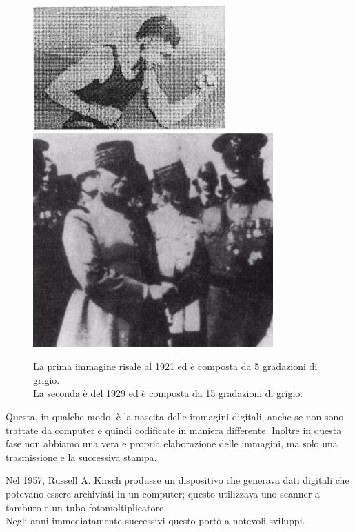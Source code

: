 \begin{figure}[htb] \centering
\includegraphics[scale=0.5, trim = 0 1.1cm 0 0, clip]{Pictures/img del 1921 a 5 gradazioni di grigio.jpg}
\qquad\qquad
\includegraphics[scale=1.7, trim = 0 1.1cm 0 0, clip]{Pictures/img del 1929 a 15 gradazioni di grigio.jpg}
\caption{La prima immagine risale al 1921 ed è composta da 5 gradazioni di grigio.\\ 
La seconda è del 1929 ed è composta da 15 gradazioni di grigio.}\label{fig:figura}
\end{figure}
\vspace{1em} \noindent
Questa, in qualche modo, è la nascita delle immagini digitali, anche se non sono trattate da computer e quindi codificate in maniera differente. Inoltre in questa fase non abbiamo una vera e propria elaborazione delle immagini, ma solo una trasmissione e la successiva stampa.

\vspace{1em} \noindent
Nel 1957, Russell A. Kirsch produsse un dispositivo che generava dati digitali che potevano essere archiviati in un computer; questo utilizzava uno scanner a tamburo e un tubo fotomoltiplicatore.\\
Negli anni immediatamente successivi questo portò a notevoli sviluppi.


